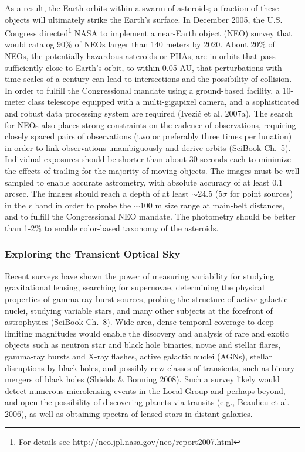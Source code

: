 \documentclass{emulateapj}
\begin{document}
As a result, the Earth orbits within a swarm of asteroids; a fraction
of these objects will ultimately strike the Earth's surface. In December 2005, 
the U.S. Congress directed\footnote{For details see
http://neo.jpl.nasa.gov/neo/report2007.html}
NASA to implement a near-Earth object (NEO) survey 
that would catalog 90\% of NEOs larger than 140 meters by 2020. 
About 20\% of NEOs, the potentially hazardous asteroids or PHAs, are 
in orbits that pass sufficiently close to Earth's orbit, to within 0.05 AU, that 
perturbations with time scales of a century can lead to intersections and 
the possibility of collision. In order to 
fulfill the Congressional mandate using a ground-based facility, a 10-meter 
class telescope equipped with a multi-gigapixel camera, and a sophisticated 
and robust data processing system are required (Ivezi\'{c} et al. 2007a). 
The search for NEOs also places strong constraints on the cadence of
observations, requiring closely spaced pairs of observations (two or preferably 
three times per lunation) in order to link observations unambiguously and 
derive orbits (SciBook Ch.~5). Individual exposures should be shorter than about 30 seconds
each to minimize the effects of trailing for the majority of moving objects. 
The images must be well sampled to enable accurate astrometry, with absolute 
accuracy of at least 0.1 arcsec. The images should reach a depth of at 
least $\sim$24.5 (5$\sigma$ for point sources) in the $r$ band in order to 
probe the $\sim100$ m size range at main-belt distances, and to fulfill the 
Congressional NEO mandate. The photometry should be better than 1-2\% to enable 
color-based taxonomy of the asteroids. 


\subsubsection{ Exploring the Transient Optical Sky}

Recent surveys have shown the power of measuring variability for studying gravitational 
lensing, searching for supernovae, determining the physical properties of 
gamma-ray burst sources, probing the structure of active galactic nuclei, studying
variable stars, and many 
other subjects at the forefront of astrophysics (SciBook Ch.~8). 
Wide-area, dense temporal coverage to deep limiting magnitudes would enable the discovery 
and analysis of rare and exotic objects such as neutron star and black hole 
binaries, novae and stellar flares, gamma-ray bursts and X-ray flashes, active
galactic nuclei (AGNs), 
stellar disruptions by black holes, and possibly new classes of transients, 
such as binary mergers of black holes (Shields \& Bonning 2008). 
Such a survey likely would detect numerous microlensing events in 
the Local Group and perhaps beyond, and open the possibility of discovering 
planets via transits (e.g., Beaulieu et al. 2006), as well as obtaining spectra of lensed 
stars in distant galaxies. 
\end{document}
